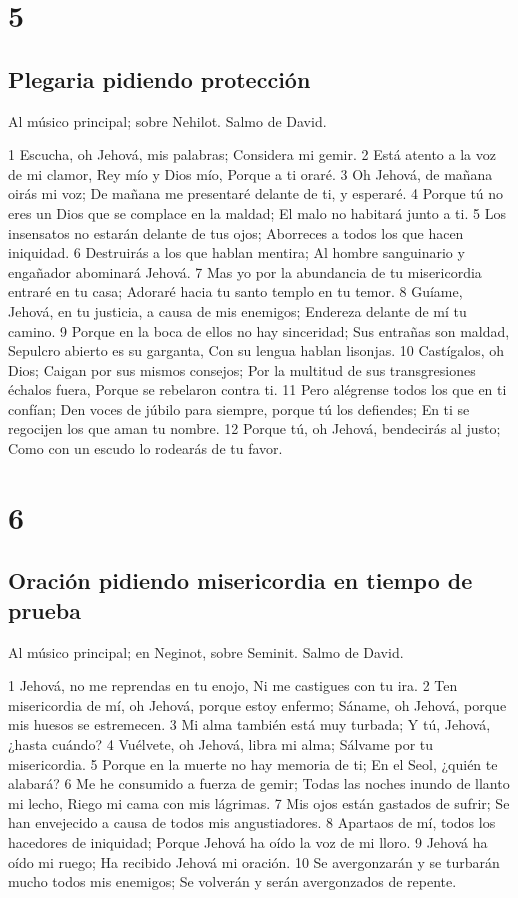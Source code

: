 \chapter{5}

\section*{Plegaria pidiendo protección}

Al músico principal; sobre Nehilot. Salmo de David.

1 Escucha, oh Jehová, mis palabras;
Considera mi gemir.
2 Está atento a la voz de mi clamor, Rey mío y Dios mío,
Porque a ti oraré.
3 Oh Jehová, de mañana oirás mi voz;
De mañana me presentaré delante de ti, y esperaré.
4 Porque tú no eres un Dios que se complace en la maldad;
El malo no habitará junto a ti.
5 Los insensatos no estarán delante de tus ojos;
Aborreces a todos los que hacen iniquidad.
6 Destruirás a los que hablan mentira;
Al hombre sanguinario y engañador abominará Jehová.
7 Mas yo por la abundancia de tu misericordia entraré en tu casa;
Adoraré hacia tu santo templo en tu temor.
8 Guíame, Jehová, en tu justicia, a causa de mis enemigos;
Endereza delante de mí tu camino.
9 Porque en la boca de ellos no hay sinceridad;
Sus entrañas son maldad,
Sepulcro abierto es su garganta,
Con su lengua hablan lisonjas.
10 Castígalos, oh Dios;
Caigan por sus mismos consejos;
Por la multitud de sus transgresiones échalos fuera,
Porque se rebelaron contra ti.
11 Pero alégrense todos los que en ti confían;
Den voces de júbilo para siempre, porque tú los defiendes;
En ti se regocijen los que aman tu nombre.
12 Porque tú, oh Jehová, bendecirás al justo;
Como con un escudo lo rodearás de tu favor.

\chapter{6}

\section*{Oración pidiendo misericordia en tiempo de prueba}

Al músico principal; en Neginot, sobre Seminit. Salmo de David.

1 Jehová, no me reprendas en tu enojo,
Ni me castigues con tu ira.
2 Ten misericordia de mí, oh Jehová, porque estoy enfermo;
Sáname, oh Jehová, porque mis huesos se estremecen.
3 Mi alma también está muy turbada;
Y tú, Jehová, ¿hasta cuándo?
4 Vuélvete, oh Jehová, libra mi alma;
Sálvame por tu misericordia.
5 Porque en la muerte no hay memoria de ti;
En el Seol, ¿quién te alabará?
6 Me he consumido a fuerza de gemir;
Todas las noches inundo de llanto mi lecho,
Riego mi cama con mis lágrimas.
7 Mis ojos están gastados de sufrir;
Se han envejecido a causa de todos mis angustiadores.
8 Apartaos de mí, todos los hacedores de iniquidad;
Porque Jehová ha oído la voz de mi lloro.
9 Jehová ha oído mi ruego;
Ha recibido Jehová mi oración.
10 Se avergonzarán y se turbarán mucho todos mis enemigos;
Se volverán y serán avergonzados de repente.

